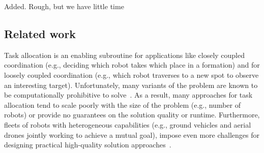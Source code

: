\documentclass[conference]{IEEEtran}
\begin{document}
{}{Added. Rough, but we have little time}

\subsection{Related work}
Task allocation is an enabling subroutine for applications like closely coupled coordination (e.g., deciding which robot takes which place in a formation) and for loosely coupled coordination (e.g., which robot traverses to a new spot to observe an interesting target). Unfortunately, many variants of the problem are known to be computationally prohibitive to solve~\cite{GerkeyMataric04,KorashETAL13}. As a result, many approaches for task allocation tend to scale poorly with the size of the problem (e.g., number of robots) or provide no guarantees on the solution quality or runtime. Furthermore, fleets of robots with heterogeneous capabilities (e.g., ground vehicles and aerial drones jointly working to achieve a mutual goal), impose even more challenges for designing practical high-quality solution approaches~\cite{BaiETAL20,AgatzETAL18,FerrandezETAL16,MurrayChu15,Wang2017}. 
\end{document}
